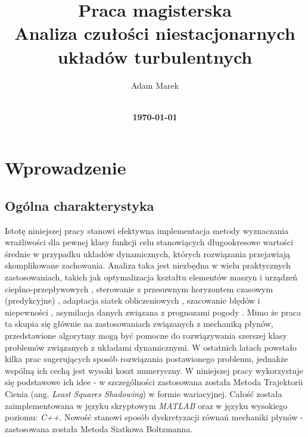 \documentclass[12pt, twoside]{book}
\title{
    \vspace*{-3cm}
    \vspace*{5cm}
    {Praca magisterska\bf} \\
    \vspace*{1cm}
    {\bf Analiza czułości niestacjonarnych układów turbulentnych} \\
    \vspace*{2cm}
}
\author{
    \sffamily Adam Marek\\
    \\[6cm]
}
\date{ {\small \bf \today} }
\begin{document}
\maketitle
\newpage
\tableofcontents
\newpage

%
\cleardoublepage


%


%


\chapter{Wprowadzenie}
\section{Ogólna charakterystyka}
Istotę niniejszej pracy stanowi efektywna implementacja metody wyznaczania wrażliwości dla pewnej klasy funkcji celu stanowiących długookresowe wartości średnie w przypadku układów dynamicznych, których rozwiązania przejawiają skomplikowane zachowania. Analiza taka jest niezbędna w wielu praktycznych zastosowaniach, takich jak optymalizacja kształtu elementów maszyn i urządzeń cieplno-przepływowych \cite{Jameson}, sterowanie z przesuwnym horyzontem czasowym (predykcyjne) \cite{Bewley1}\cite{Bewley2}, adaptacja siatek obliczeniowych \cite{Venditti}, szacowanie błędów i niepewności \cite{Cavaglieri}, asymilacja danych związana z prognozami pogody \cite{Thepaut}. Mimo że praca ta skupia się głównie na zastosowaniach związanych z mechaniką płynów, przedstawione algorytmy mogą być pomocne do rozwiązywania szerszej klasy problemów związanych z układami dynamicznymi.\newline 
W ostatnich latach powstało kilka prac sugerujących sposób rozwiązania postawionego problemu, jednakże wspólną ich cechą jest wysoki koszt numeryczny. W niniejszej pracy wykorzystuje się podstawowe ich idee - w szczególności zastosowana została Metoda Trajektorii Cienia (ang. \textit{Least Squares Shadowing}) w formie wariacyjnej. Całość została zaimplementowana w języku skryptowym \textit{MATLAB} oraz w języku wysokiego poziomu: \textit{C++}. Nowość stanowi sposób dyskretyzacji równań mechaniki płynów - zastosowana została Metoda Siatkowa Boltzmanna.
\end{document}

